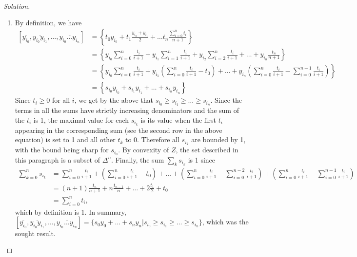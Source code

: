 \begin{proof}[Solution]
  \hfill

\begin{enumerate}[font=\scshape,label=\textbf{(\Alph*)}, wide]
  \item By definition, we have
  \[
  \begin{aligned}
[\overline{y_{i_0}}, \overline{y_{i_0}y_{i_1}}, \ldots , \overline{y_{i_0}\ldots y_{i_n}}] &= \left\{t_0 y_{i_0} + t_1 \frac{y_{i_0} + y_{i_1} }{2} + \ldots t_n\frac{\sum_{i=0}^n t_i}{n+1}\right\} \\
&=\left\{y_{i_0}\sum_{i = 0}^n\frac{t_i}{i+1} + y_{i_1} \sum_{i = 1}^n\frac{t_i}{i+1} +y_{i_2} \sum_{i = 2}^n\frac{t_i}{i+1} + \ldots + y_{i_n}\frac{t_n}{n+1}\right\} \\
&=\left\{y_{i_0}\sum_{i = 0}^n\frac{t_i}{i+1} + y_{i_1}\left( \sum_{i = 0}^n\frac{t_i}{i+1} -t_0 \right) + \ldots + y_{i_n}\left( \sum_{i = 0}^n\frac{t_i}{i+1} - \sum_{i = 0}^{n-1}\frac{t_i}{i+1} \right)\right\} \\
&= \left\{s_{i_0} y_{i_0} + s_{i_1} y_{i_1} + \ldots + s_{i_n} y_{i_n}\right\}
\end{aligned}
\]
Since $t_i \geq 0$ for all $i$, we get by the above that $s_{i_0} \geq s_{i_1} \geq \ldots \geq s_{i_n}$. Since the terms in all the sums have strictly increasing denominators and the sum of the $t_i$ is 1, the maximal value for each $s_{i_k}$ is its value when the first $t_i$ appearing in the corresponding sum (see the second row in the above equation) is set to 1 and all other $t_k$ to 0. Therefore all $s_{i_k}$ are bounded by 1, with the bound being sharp for $s_{i_0}$. By convexity of $Z$, the set described in this paragraph is a subset of $\Delta^n$. Finally, the sum $\sum_k s_{i_k}$ is 1 since
\[
\begin{aligned}
\sum_{k= 0}^n s_{i_k} &= \sum_{i = 0}^n\frac{t_i}{i+1} + \left( \sum_{i = 0}^n\frac{t_i}{i+1} -t_0 \right) + \ldots + \left( \sum_{i = 0}^n\frac{t_i}{i+1} - \sum_{i = 0}^{n-2}\frac{t_i}{i+1} \right) + \left( \sum_{i = 0}^n\frac{t_i}{i+1} - \sum_{i = 0}^{n-1}\frac{t_i}{i+1} \right) \\
&= (n+1)\frac{t_n}{n+1} + n\frac{t_{n-1}}{n} + \ldots + 2 \frac{t_1}{2} +  t_0 \\
&= \sum_{i=0}^n t_i,
\end{aligned}
\]
which by definition is 1. In summary,
$[\overline{y_{i_0}}, \overline{y_{i_0}y_{i_1}}, \ldots , \overline{y_{i_0}\ldots y_{i_n}}] =\{s_0 y_0 + \ldots + s_n y_n | s_{i_0} \geq s_{i_1} \geq \ldots \geq s_{i_n} \}$, which was the sought result.


\end{enumerate}
\end{proof}

